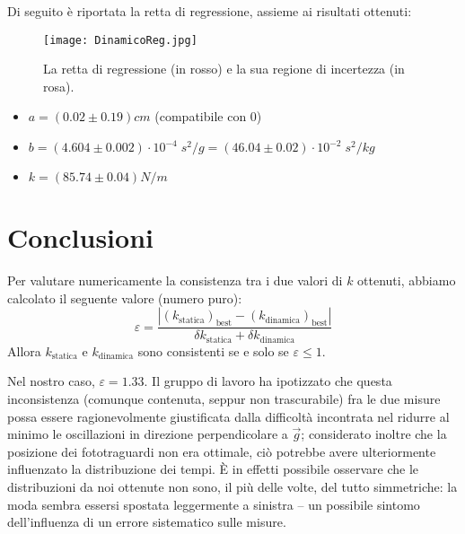 \documentclass{article}
\begin{document}
Di seguito è riportata la retta di regressione, assieme ai risultati ottenuti:

\begin{figure}[H]
    \texttt{[image: DinamicoReg.jpg]}
    \caption{
        La retta di regressione (in rosso)
        e la sua regione di incertezza (in rosa).
    }
\end{figure}

\begin{itemize}
    \item $a = \left(0.02\pm0.19\right)\unit{cm}$ (compatibile con 0)
    \item $
        b = \left(4.604\pm0.002\right)\cdot10^{-4}\;\unit{s^2\per g}
          = \left(46.04\pm0.02\right)\cdot10^{-2}\;\unit{s^2\per kg}
    $
    \item $k = \left(85.74\pm0.04\right)\unit{N\per m}$
\end{itemize}


\section{Conclusioni}
Per valutare numericamente la consistenza tra i due valori di $k$ ottenuti,
abbiamo calcolato il seguente valore (numero puro):
\[
    \varepsilon =
    \frac{
        \left|\left(k_\text{statica}\right)_\text{best} - \left(k_\text{dinamica}\right)_\text{best}\right|
    }{
        \delta k_\text{statica} + \delta k_\text{dinamica}
    }
\]
Allora $k_\text{statica}$ e $k_\text{dinamica}$ sono consistenti se e solo se $\varepsilon \le 1$.

Nel nostro caso, $\varepsilon = 1.33$. Il gruppo di lavoro ha ipotizzato che
questa inconsistenza (comunque contenuta, seppur non trascurabile) fra le due
misure possa essere ragionevolmente giustificata dalla difficoltà incontrata
nel ridurre al minimo le oscillazioni in direzione perpendicolare a $\vec{g}$;
considerato inoltre che la posizione dei fototraguardi non era ottimale, ciò
potrebbe avere ulteriormente influenzato la distribuzione dei tempi. È in
effetti possibile osservare che le distribuzioni da noi ottenute non sono,
il più delle volte, del tutto simmetriche: la moda sembra essersi spostata
leggermente a sinistra – un possibile sintomo dell'influenza di un
errore sistematico sulle misure.
\end{document}
